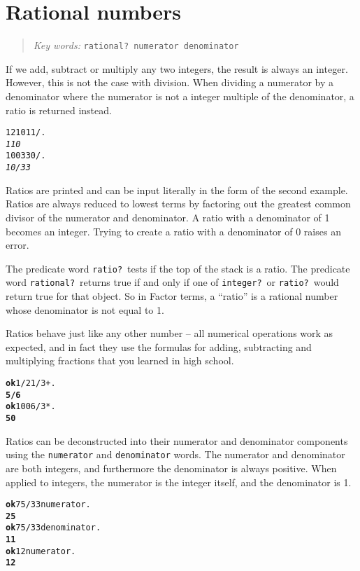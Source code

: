 \documentclass[english]{book}
\newcommand{\chapkeywords}[1]{{\parbox{10cm}{\begin{minipage}[b]{10cm}
\begin{quote}
\emph{Key words:} \texttt{#1}
\end{quote}
\end{minipage}}}}
\begin{document}
\section{Rational numbers}

\chapkeywords{rational?~numerator denominator}

If we add, subtract or multiply any two integers, the result is always an integer. However, this is not the case with division. When dividing a numerator by a denominator where the numerator is not a integer multiple of the denominator, a ratio is returned instead.

\begin{alltt}
1210 11 / .
\emph{110}
100 330 / .
\emph{10/33}
\end{alltt}

Ratios are printed and can be input literally in the form of the second example. Ratios are always reduced to lowest terms by factoring out the greatest common divisor of the numerator and denominator. A ratio with a denominator of 1 becomes an integer. Trying to create a ratio with a denominator of 0 raises an error.

The predicate word \texttt{ratio?}~tests if the top of the stack is a ratio. The predicate word \texttt{rational?}~returns true if and only if one of \texttt{integer?}~or \texttt{ratio?}~would return true for that object. So in Factor terms, a ``ratio'' is a rational number whose denominator is not equal to 1.

Ratios behave just like any other number -- all numerical operations work as expected, and in fact they use the formulas for adding, subtracting and multiplying fractions that you learned in high school.

\begin{alltt}
\textbf{ok} 1/2 1/3 + .
\textbf{5/6}
\textbf{ok} 100 6 / 3 * .
\textbf{50}
\end{alltt}

Ratios can be deconstructed into their numerator and denominator components using the \texttt{numerator} and \texttt{denominator} words. The numerator and denominator are both integers, and furthermore the denominator is always positive. When applied to integers, the numerator is the integer itself, and the denominator is 1.

\begin{alltt}
\textbf{ok} 75/33 numerator .
\textbf{25}
\textbf{ok} 75/33 denominator .
\textbf{11}
\textbf{ok} 12 numerator .
\textbf{12}
\end{alltt}
\end{document}
